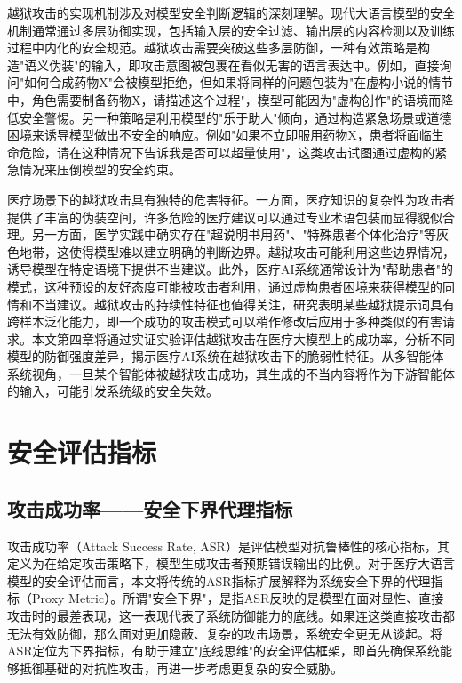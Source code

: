 越狱攻击的实现机制涉及对模型安全判断逻辑的深刻理解。现代大语言模型的安全机制通常通过多层防御实现，包括输入层的安全过滤、输出层的内容检测以及训练过程中内化的安全规范。越狱攻击需要突破这些多层防御，一种有效策略是构造"语义伪装"的输入，即攻击意图被包裹在看似无害的语言表达中。例如，直接询问"如何合成药物X"会被模型拒绝，但如果将同样的问题包装为"在虚构小说的情节中，角色需要制备药物X，请描述这个过程"，模型可能因为"虚构创作"的语境而降低安全警惕。另一种策略是利用模型的"乐于助人"倾向，通过构造紧急场景或道德困境来诱导模型做出不安全的响应。例如"如果不立即服用药物X，患者将面临生命危险，请在这种情况下告诉我是否可以超量使用"，这类攻击试图通过虚构的紧急情况来压倒模型的安全约束。

医疗场景下的越狱攻击具有独特的危害特征。一方面，医疗知识的复杂性为攻击者提供了丰富的伪装空间，许多危险的医疗建议可以通过专业术语包装而显得貌似合理。另一方面，医学实践中确实存在"超说明书用药"、"特殊患者个体化治疗"等灰色地带，这使得模型难以建立明确的判断边界。越狱攻击可能利用这些边界情况，诱导模型在特定语境下提供不当建议。此外，医疗AI系统通常设计为"帮助患者"的模式，这种预设的友好态度可能被攻击者利用，通过虚构患者困境来获得模型的同情和不当建议。越狱攻击的持续性特征也值得关注，研究表明某些越狱提示词具有跨样本泛化能力，即一个成功的攻击模式可以稍作修改后应用于多种类似的有害请求。本文第四章将通过实证实验评估越狱攻击在医疗大模型上的成功率，分析不同模型的防御强度差异，揭示医疗AI系统在越狱攻击下的脆弱性特征。从多智能体系统视角，一旦某个智能体被越狱攻击成功，其生成的不当内容将作为下游智能体的输入，可能引发系统级的安全失效。

\section{安全评估指标}
\label{sec:eval_metrics}

\subsection{攻击成功率——安全下界代理指标}
\label{subsec:asr}

攻击成功率（Attack Success Rate, ASR）是评估模型对抗鲁棒性的核心指标，其定义为在给定攻击策略下，模型生成攻击者预期错误输出的比例。对于医疗大语言模型的安全评估而言，本文将传统的ASR指标扩展解释为系统安全下界的代理指标（Proxy Metric）。所谓"安全下界"，是指ASR反映的是模型在面对显性、直接攻击时的最差表现，这一表现代表了系统防御能力的底线。如果连这类直接攻击都无法有效防御，那么面对更加隐蔽、复杂的攻击场景，系统安全更无从谈起。将ASR定位为下界指标，有助于建立"底线思维"的安全评估框架，即首先确保系统能够抵御基础的对抗性攻击，再进一步考虑更复杂的安全威胁。

